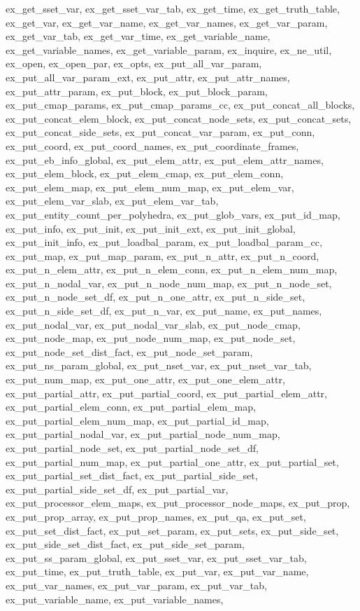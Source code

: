 {{ex_get_sset_var,
ex_get_sset_var_tab,
ex_get_time,
ex_get_truth_table,
ex_get_var,
ex_get_var_name,
ex_get_var_names,
ex_get_var_param,
ex_get_var_tab,
ex_get_var_time,
ex_get_variable_name,
ex_get_variable_names,
ex_get_variable_param,
ex_inquire,
ex_ne_util,
ex_open,
ex_open_par,
ex_opts,
ex_put_all_var_param,
ex_put_all_var_param_ext,
ex_put_attr,
ex_put_attr_names,
ex_put_attr_param,
ex_put_block,
ex_put_block_param,
ex_put_cmap_params,
ex_put_cmap_params_cc,
ex_put_concat_all_blocks,
ex_put_concat_elem_block,
ex_put_concat_node_sets,
ex_put_concat_sets,
ex_put_concat_side_sets,
ex_put_concat_var_param,
ex_put_conn,
ex_put_coord,
ex_put_coord_names,
ex_put_coordinate_frames,
ex_put_eb_info_global,
ex_put_elem_attr,
ex_put_elem_attr_names,
ex_put_elem_block,
ex_put_elem_cmap,
ex_put_elem_conn,
ex_put_elem_map,
ex_put_elem_num_map,
ex_put_elem_var,
ex_put_elem_var_slab,
ex_put_elem_var_tab,
ex_put_entity_count_per_polyhedra,
ex_put_glob_vars,
ex_put_id_map,
ex_put_info,
ex_put_init,
ex_put_init_ext,
ex_put_init_global,
ex_put_init_info,
ex_put_loadbal_param,
ex_put_loadbal_param_cc,
ex_put_map,
ex_put_map_param,
ex_put_n_attr,
ex_put_n_coord,
ex_put_n_elem_attr,
ex_put_n_elem_conn,
ex_put_n_elem_num_map,
ex_put_n_nodal_var,
ex_put_n_node_num_map,
ex_put_n_node_set,
ex_put_n_node_set_df,
ex_put_n_one_attr,
ex_put_n_side_set,
ex_put_n_side_set_df,
ex_put_n_var,
ex_put_name,
ex_put_names,
ex_put_nodal_var,
ex_put_nodal_var_slab,
ex_put_node_cmap,
ex_put_node_map,
ex_put_node_num_map,
ex_put_node_set,
ex_put_node_set_dist_fact,
ex_put_node_set_param,
ex_put_ns_param_global,
ex_put_nset_var,
ex_put_nset_var_tab,
ex_put_num_map,
ex_put_one_attr,
ex_put_one_elem_attr,
ex_put_partial_attr,
ex_put_partial_coord,
ex_put_partial_elem_attr,
ex_put_partial_elem_conn,
ex_put_partial_elem_map,
ex_put_partial_elem_num_map,
ex_put_partial_id_map,
ex_put_partial_nodal_var,
ex_put_partial_node_num_map,
ex_put_partial_node_set,
ex_put_partial_node_set_df,
ex_put_partial_num_map,
ex_put_partial_one_attr,
ex_put_partial_set,
ex_put_partial_set_dist_fact,
ex_put_partial_side_set,
ex_put_partial_side_set_df,
ex_put_partial_var,
ex_put_processor_elem_maps,
ex_put_processor_node_maps,
ex_put_prop,
ex_put_prop_array,
ex_put_prop_names,
ex_put_qa,
ex_put_set,
ex_put_set_dist_fact,
ex_put_set_param,
ex_put_sets,
ex_put_side_set,
ex_put_side_set_dist_fact,
ex_put_side_set_param,
ex_put_ss_param_global,
ex_put_sset_var,
ex_put_sset_var_tab,
ex_put_time,
ex_put_truth_table,
ex_put_var,
ex_put_var_name,
ex_put_var_names,
ex_put_var_param,
ex_put_var_tab,
ex_put_variable_name,
ex_put_variable_names,
}}
